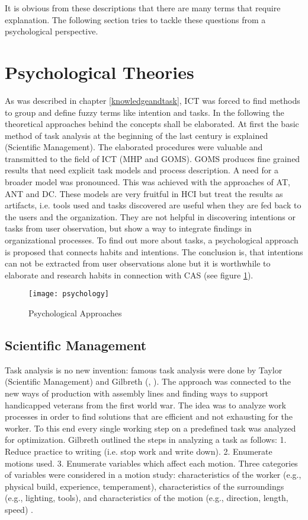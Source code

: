 It is obvious from these descriptions that there are many terms that require explanation. The following section tries to tackle these questions from a psychological perspective. 

\section{Psychological Theories}
As was described in chapter \ref{knowledgeandtask}, \acs{ICT} was forced to find methods to group and define fuzzy terms like intention and tasks. In the following the theoretical approaches behind the concepts shall be elaborated. At first the basic method of task analysis at the beginning of the last century is explained (Scientific Management). The elaborated procedures were valuable and transmitted to the field of \acs{ICT} (MHP and GOMS). \ac{GOMS} produces fine grained results that need explicit task models and process description. A need for a broader model was pronounced. This was achieved with the approaches of \ac{AT}, \ac{ANT} and \ac{DC}. These models are very fruitful in \ac{HCI} but treat the results as artifacts, i.e. tools used and tasks discovered are useful when they are fed back to the users and the organization. They are not helpful in discovering intentions or tasks from user observation, but show a way to integrate findings in organizational processes. To find out more about tasks,  a psychological approach is proposed that connects habits and intentions. The conclusion is, that intentions can not be extracted from user observations alone but it is worthwhile to elaborate and research habits in connection with \ac{CAS} (see figure \ref{fig4}).

\begin{figure}[ht]
	\centering
  \texttt{[image: psychology]}
	\caption{Psychological Approaches}
	\label{fig4}
\end{figure}


\subsection{Scientific Management}
Task analysis is no new invention: famous task analysis were done by Taylor (Scientific Management) and Gilbreth (\cite{taylor2013scientific}, \cite{gilbreth1911motion}). The approach was connected to the new ways of production with assembly lines and finding ways to support handicapped veterans from the first world war. The idea was to analyze work processes in order to find solutions that are efficient and not exhausting for the worker. To this end every single working step on a predefined task was analyzed for optimization. Gilbreth outlined the steps in analyzing a task as follows: 1. Reduce practice to writing (i.e. stop work and write down). 2. Enumerate motions used. 3. Enumerate variables which affect each motion. Three categories of variables were considered in a motion study: characteristics of the worker (e.g., physical build, experience, temperament), characteristics of the surroundings (e.g., lighting, tools), and characteristics of the motion (e.g., direction, length, speed) \cite{creighton1992origin}.


